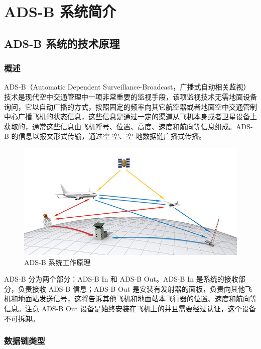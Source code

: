 
\chapter{ADS-B 系统简介}

\section{ADS-B 系统的技术原理}

\subsection{概述}

ADS-B（Automatic Dependent Surveillance-Broadcast，广播式自动相关监视）技术是现代空中交通管理中一项非常重要的监视手段，该项监视技术无需地面设备询问，它以自动广播的方式，按照固定的频率向其它航空器或者地面空中交通管制中心广播飞机的状态信息，这些信息是通过一定的渠道从飞机本身或者卫星设备上获取的，通常这些信息由飞机呼号、位置、高度、速度和航向等信息组成。ADS-B 的信息以报文形式传输，通过空-空、空-地数据链广播式传播。

\begin{figure}[htbp]
\centering
\includegraphics[width=13cm]{pic/Advocacy_ADS_B.jpg}
\caption{ADS-B 系统工作原理}
\label{fig:Advocacy_ADS_B}
\end{figure}

ADS-B 分为两个部分：ADS-B In 和 ADS-B Out。ADS-B In 是系统的接收部分，负责接收 ADS-B 信息；ADS-B Out 是安装有发射器的面板，负责向其他飞机和地面站发送信号，这将告诉其他飞机和地面站本飞行器的位置、速度和航向等信息。注意 ADS-B Out 设备是始终安装在飞机上的并且需要经过认证，这个设备不可拆卸。

\subsection{数据链类型}


